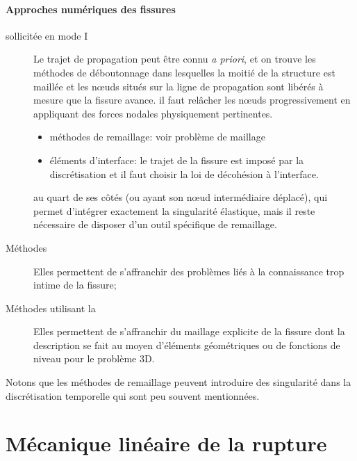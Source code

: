 \paragraph{Approches numériques des fissures}
\begin{description}
  \item[ sollicitée en mode I]
	Le trajet de propagation peut être connu \emph{a priori}, et on trouve les
	méthodes de déboutonnage dans lesquelles la moitié de la structure est
	maillée et les nœuds situés sur la ligne de propagation sont libérés
	à mesure que la fissure avance.  il faut relâcher les nœuds
	progressivement en appliquant des forces nodales physiquement
	pertinentes.
  \item[]\mbox{}
\begin{itemize}
\item méthodes de remaillage:
	voir problème de maillage
  \item éléments d'interface:
	le trajet de la fissure est imposé par la discrétisation et il faut choisir
	la loi de décohésion à l'interface.
	\end{itemize}
  \item[]
	au quart de ses côtés (ou ayant son nœud intermédiaire déplacé), qui
	permet d'intégrer exactement la singularité élastique, mais il reste
	nécessaire de disposer d'un outil spécifique de remaillage.
  \item[Méthodes ] Elles permettent de s'affranchir
	des problèmes liés à la connaissance trop intime de la fissure;
  \item[Méthodes utilisant la ]
	Elles permettent de s'affranchir du maillage explicite de la fissure dont la
	description se fait au moyen d'éléments géométriques ou de fonctions
	de niveau pour le problème 3D.
\end{description}
Notons que les méthodes de remaillage peuvent introduire des singularité dans la
discrétisation temporelle qui sont peu souvent mentionnées.



\medskip
\newpage%
\section{Mécanique linéaire de la rupture}

\medskip
